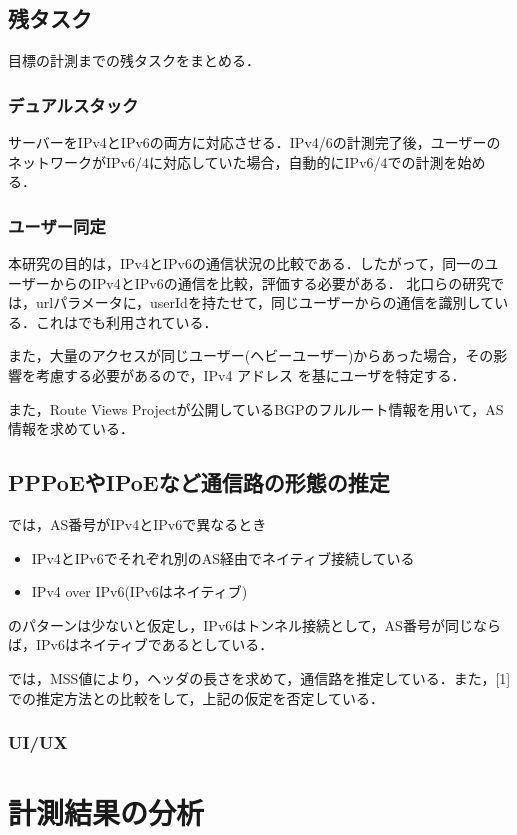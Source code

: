 \documentclass[rinkou,a4paper]{ieicej}
\begin{document}
\subsection{残タスク}
目標の計測までの残タスクをまとめる．
\subsubsection{デュアルスタック}
サーバーをIPv4とIPv6の両方に対応させる．IPv4/6の計測完了後，ユーザーのネットワークがIPv6/4に対応していた場合，自動的にIPv6/4での計測を始める．
\subsubsection{ユーザー同定}
本研究の目的は，IPv4とIPv6の通信状況の比較である．したがって，同一のユーザーからのIPv4とIPv6の通信を比較，評価する必要がある．
北口らの研究\cite{kitaguchi1}では，urlパラメータに，userIdを持たせて，同じユーザーからの通信を識別している．これは\cite{kitaguchi2}でも利用されている．

また，大量のアクセスが同じユーザー(ヘビーユーザー)からあった場合，その影響を考慮する必要があるので，IPv4 アドレス
を基にユーザを特定する．

また，Route Views Project\cite{routeview}が公開しているBGPのフルルート情報を用いて，AS情報を求めている．

\subsection{PPPoEやIPoEなど通信路の形態の推定}
\cite{kitaguchi1}では，AS番号がIPv4とIPv6で異なるとき
\begin{itemize}
 \item IPv4とIPv6でそれぞれ別のAS経由でネイティブ接続している
 \item IPv4 over IPv6(IPv6はネイティブ)
\end{itemize}
のパターンは少ないと仮定し，IPv6はトンネル接続として，AS番号が同じならば，IPv6はネイティブであるとしている．

\cite{kitaguchi2}では，MSS値により，ヘッダの長さを求めて，通信路を推定している．また，[1]での推定方法との比較をして，上記の仮定を否定している．

\subsubsection{UI/UX}

\section{計測結果の分析}
\end{document}
